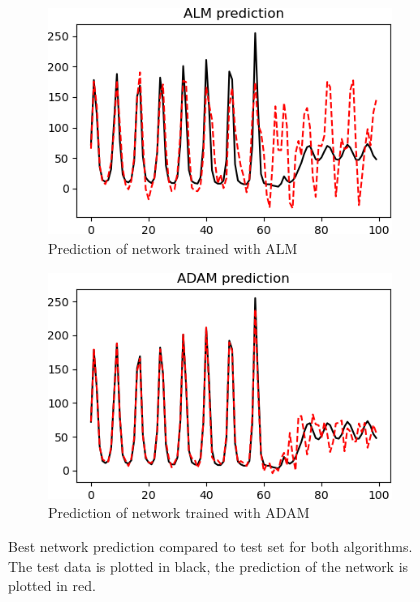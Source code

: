 \begin{figure}[p]
     \centering
     \begin{subfigure}[b]{0.49\textwidth}
         \centering
         \includegraphics[width=\textwidth]{almpred}
         \caption{Prediction of network trained with ALM}
         \label{almpred}
     \end{subfigure}
     \begin{subfigure}[b]{0.49\textwidth}
         \centering
         \includegraphics[width=\textwidth]{adampred}
         \caption{Prediction of network trained with ADAM}
         \label{adampred}
     \end{subfigure}
     \caption{Best network prediction compared to test set for both algorithms. The test data is plotted in black, the prediction of the network is plotted in red.}
     \label{laserpred}
\end{figure}

